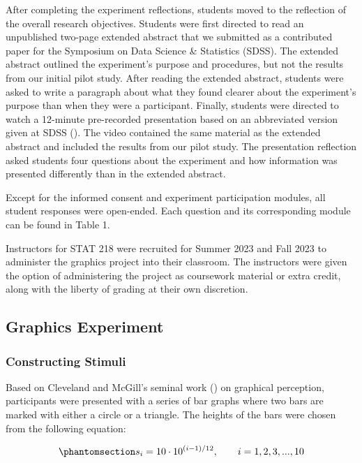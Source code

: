 \documentclass[
  12pt,
]{article}
\begin{document}
After completing the experiment reflections, students moved to the
reflection of the overall research objectives. Students were first
directed to read an unpublished two-page extended abstract that we
submitted as a contributed paper for the Symposium on Data Science \&
Statistics (SDSS). The extended abstract outlined the experiment's
purpose and procedures, but not the results from our initial pilot
study. After reading the extended abstract, students were asked to write
a paragraph about what they found clearer about the experiment's purpose
than when they were a participant. Finally, students were directed to
watch a 12-minute pre-recorded presentation based on an abbreviated
version given at SDSS ().
The video contained the same material as the extended abstract and
included the results from our pilot study. The presentation reflection
asked students four questions about the experiment and how information
was presented differently than in the extended abstract.

Except for the informed consent and experiment participation modules,
all student responses were open-ended. Each question and its
corresponding module can be found in Table 1.

Instructors for STAT 218 were recruited for Summer 2023 and Fall 2023 to
administer the graphics project into their classroom. The instructors
were given the option of administering the project as coursework
material or extra credit, along with the liberty of grading at their own
discretion.

\subsection{Graphics Experiment}\label{graphics-experiment}

\subsubsection{Constructing Stimuli}\label{constructing-stimuli}

Based on Cleveland and McGill's seminal work
() on graphical perception,
participants were presented with a series of bar graphs where two bars
are marked with either a circle or a triangle. The heights of the bars
were chosen from the following equation:

\begin{equation}\phantomsection\label{eq-vals}{s_i=10\cdot 10^{(i-1)/12}, \qquad i=1,2,3,...,10}\end{equation}
\end{document}
